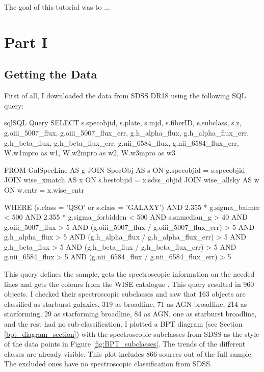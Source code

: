 \documentclass[letterpaper, oneside]{article}
\begin{document}
	
\templatePagecfg


The goal of this tutorial was to ...


\section{Part I}

\subsection{Getting the Data}

First of all, I downloaded the data from SDSS DR18 \cite{sdss_dr18} using the following SQL query:

\begin{sourcecode}[\label{sdss_query}]{sql}{SQL Query}
SELECT s.specobjid, s.plate, s.mjd, s.fiberID, s.subclass, s.z, 
g.oiii_5007_flux, g.oiii_5007_flux_err, 
g.h_alpha_flux, g.h_alpha_flux_err, 
g.h_beta_flux, g.h_beta_flux_err, 
g.nii_6584_flux, g.nii_6584_flux_err, 
W.w1mpro as w1, W.w2mpro as w2, W.w3mpro as w3

FROM GalSpecLine AS g 
JOIN SpecObj AS s ON g.specobjid = s.specobjid
JOIN wise_xmatch AS x ON s.bestobjid = x.sdss_objid
JOIN wise_allsky AS w ON w.cntr = x.wise_cntr

WHERE
(s.class = 'QSO' or s.class = 'GALAXY')
AND 2.355 * g.sigma_balmer < 500
AND 2.355 * g.sigma_forbidden < 500
AND s.snmedian_g > 40
AND g.oiii_5007_flux > 5
AND (g.oiii_5007_flux / g.oiii_5007_flux_err) > 5
AND g.h_alpha_flux > 5
AND (g.h_alpha_flux / g.h_alpha_flux_err) > 5
AND g.h_beta_flux > 5
AND (g.h_beta_flux / g.h_beta_flux_err) > 5
AND g.nii_6584_flux > 5
AND (g.nii_6584_flux / g.nii_6584_flux_err) > 5
\end{sourcecode}

This query defines the sample, gets the spectroscopic information on the needed lines and gets the colours from the WISE catalogue \cite{wise_allsky}. This query resulted in 960 objects. I checked their spectroscopic subclasses and saw that 163 objects are classified as starburst galaxies, 319 as broadline, 71 as AGN broadline, 214 as starforming, 29 as starforming broadline, 84 as AGN, one as starburst broadline, and the rest had no sub-classification. I plotted a BPT diagram (see Section \ref{bpt_diagram_section}) with the spectroscopic subclasses from SDSS as the style of the data points in Figure \ref{fig:BPT_subclasses}. The trends of the different classes are already visible. This plot includes 866 sources out of the full sample. The excluded ones have no spectroscopic classification from SDSS.
\end{document}
